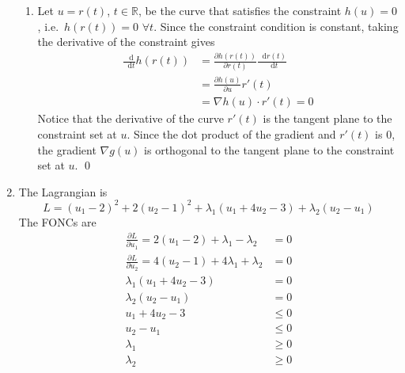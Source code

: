 \documentclass[letterpaper,12pt,titlepage]{article}
\newcommand*\dif{\mathop{}\!\mathrm{d}}
\newcommand*\pder[2]{\frac{\partial #1}{\partial #2}}
\newcommand*\R{\mathbb{R}}
\begin{document}
\begin{enumerate}[leftmargin=0pt]
\begin{enumerate}
  \item Let $u=r(t)$, $t\in\R$, be the curve that satisfies the constraint $h(u)=0$, i.e.\ $h(r(t))=0$ $\forall t$. Since the constraint condition is constant, taking the derivative of the constraint gives
    \begin{align}
      \frac{\dif}{\dif t} h(r(t)) &= \pder{h(r(t))}{r(t)} \frac{\dif r(t)}{\dif t} \\
                                  &= \pder{h(u)}{u} r'(t) \\
                                  &= \nabla h(u) \cdot r'(t) = 0
    \end{align}
    Notice that the derivative of the curve $r'(t)$ is the tangent plane to the constraint set at $u$. Since the dot product of the gradient and $r'(t)$ is 0, the gradient $\nabla g(u)$ is orthogonal to the tangent plane to the constraint set at $u$. \qed
  \end{enumerate}

\item The Lagrangian is
  \[ L = (u_1-2)^2 + 2(u_2-1)^2 + \lambda_1(u_1+4u_2-3) + \lambda_2(u_2-u_1) \]
  The FONCs are
  \begin{align}
    \pder{L}{u_1} = 2(u_1-2) + \lambda_1 - \lambda_2 &= 0 \\
    \pder{L}{u_2} = 4(u_2-1) + 4\lambda_1 + \lambda_2 &= 0\\
    \lambda_1(u_1+4u_2-3) &= 0 \\
    \lambda_2(u_2-u_1) &= 0 \\
    u_1+4u_2-3 &\le 0 \\
    u_2-u_1 &\le 0 \\
    \lambda_1 &\ge 0 \\
    \lambda_2 &\ge 0
  \end{align}


\end{enumerate}
\end{document}
